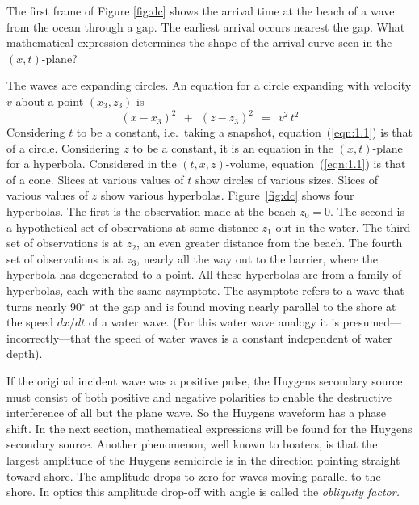 The first frame of
Figure \ref{fig:dc} shows the arrival time at the beach
of a wave from the ocean through a gap.
The earliest arrival occurs nearest the gap.
What mathematical expression determines
the shape of the arrival curve seen in the $(x , t)$-plane?
\par
The waves are expanding circles.
An equation for a circle expanding with velocity  $v$  about
a point  $( x_3 , z_3 )$  is
\begin{equation}
{ ( x - x_3 ) }^2\ \ +\ \ {( z - z_3 )}^2\ \ =\ \ 
v^2 \, t^2
\label{eqn:1.1}
\end{equation}
Considering  $t$  to be a constant,
i.e.~taking a snapshot, equation~(\ref{eqn:1.1}) is that of a circle.
Considering  $z$  to be a constant,
it is an equation in the $(x , t)$-plane for a hyperbola.  
Considered in the $(t , x , z)$-volume,
equation~(\ref{eqn:1.1}) is that of a cone.
Slices at various values of  $t$  show circles of various sizes.
Slices of various values of  $z$  show various hyperbolas.
Figure~\ref{fig:dc} shows four hyperbolas.
The first is the observation made at the beach  $z_0 = 0$.  
The second is a hypothetical set of observations at
some distance  $z_1$  out in the water.
The third set of observations is at  $z_2$,
an even greater distance from the beach.
The fourth set of observations is at  $z_3$,
nearly all the way out to the barrier,
where the hyperbola has degenerated to a point.
All these hyperbolas are from a family of hyperbolas,
each with the same asymptote.
The asymptote refers to a wave that turns nearly 90$^\circ$ at the gap and
is found moving nearly parallel to the shore at the
speed  $dx/dt$  of a water wave.
(For this water wave analogy it is presumed---incorrectly---that
the speed of water waves is a constant independent of water depth).
\par
If the original incident wave was a positive pulse,
the Huygens secondary source must consist of both positive
and negative polarities to enable the destructive
interference of all but the plane wave.
So the Huygens waveform has a phase shift.
In the next section,
mathematical expressions will be found for the Huygens secondary source.
Another phenomenon, well known to boaters,
is that the largest amplitude of the Huygens semicircle
is in the direction pointing straight toward shore.
The amplitude drops to zero for waves moving parallel to the shore.
In optics this amplitude drop-off with angle is called the
{\em 
obliquity factor.
}

